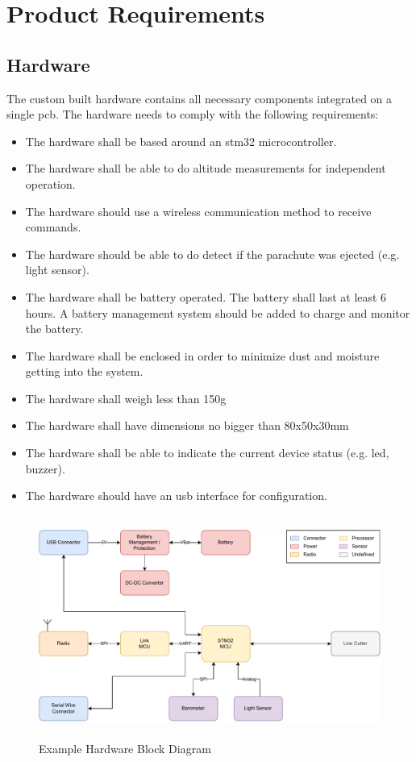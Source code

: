 \newpage
\section{Product Requirements}

\subsection{Hardware}
The custom built hardware contains all necessary components integrated on a single \acrfull{pcb}. The hardware needs to comply with the following requirements: 
\begin{itemize}
		\item The hardware shall be based around an \gls{stm32} microcontroller.
		\item The hardware shall be able to do altitude measurements for independent operation.
		\item The hardware should use a wireless communication method to receive commands.
		\item The hardware should be able to do detect if the parachute was ejected (e.g. light sensor).
		\item The hardware shall be battery operated.
		\subitem The battery shall last at least 6 hours.
		\subitem A battery management system should be added to charge and monitor the battery.
		\item The hardware shall be enclosed in order to minimize dust and moisture getting into the system.
		\item The hardware shall weigh less than 150g
		\item The hardware shall have dimensions no bigger than 80x50x30mm
		\item The hardware shall be able to indicate the current device status (e.g. \acrshort{led}, buzzer).
		\item The hardware should have an \acrshort{usb} interface for configuration.
\end{itemize}
\medskip
\begin{figure}[h!]
	\centering
	\includegraphics[height=7.3cm]{images/block_diagram}
	\caption{Example Hardware Block Diagram}
	\label{fig:hardware_block_diagram}
\end{figure}

